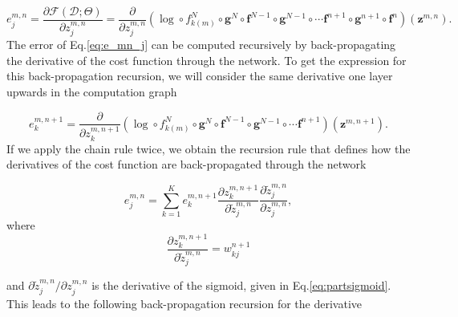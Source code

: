 \begin{equation}
e^{m,n}_j =  \frac{\partial \mathcal{F}(\mathcal{D};\Theta)}{\partial z^{m,n}_{j}} = \frac{\partial}{\partial z^{m,n}_{j}} (\log \circ f_{k(m)}^N \circ \mathbf{g}^N \circ \mathbf{f}^{N-1} \circ \mathbf{g}^{N-1} \circ \cdots \mathbf{f}^{n+1} \circ \mathbf{g}^{n+1} \circ \mathbf{f}^{n})(\mathbf{z}^{m,n}).
\label{eq:e_mn_j}
\end{equation}
%
The error of Eq.\ref{eq:e_mn_j} can be computed recursively by back-propagating the derivative of the cost function through the network.
To get the expression for this back-propagation recursion, we will consider the same derivative one layer upwards in the
computation graph  

\begin{equation}
e^{m,n+1}_k = \frac{\partial}{\partial z^{m,n+1}_{k}} (\log \circ f_{k(m)}^N \circ \mathbf{g}^N \circ \mathbf{f}^{N-1} \circ \mathbf{g}^{N-1} \circ \cdots \mathbf{f}^{n+1})(\mathbf{z}^{m,n+1}).
\end{equation}
%
%
\noindent If we apply the chain rule twice, we obtain the
recursion rule that defines how the derivatives of the cost function are back-propagated through the network\footnotemark{}

\begin{equation}
e^{m,n}_j = \sum_{k=1}^K e^{m,n+1}_k \frac{\partial z^{m,n+1}_k}{\partial \tilde{z}_{j}^{m,n}}\frac{\partial \tilde{z}^{m,n}_{j}}{\partial z_{j}^{m,n}},
\label{eq:chainRulRecursion}
\end{equation}
%
where %
\begin{equation}
\frac{\partial z^{m,n+1}_k}{\partial \tilde{z}_{j}^{m,n}} = w_{kj}^{n+1} 
\end{equation}

\noindent and ${\partial \tilde{z}^{m,n}_{j}}/{\partial z_{j}^{m,n}}$ is the derivative of the sigmoid, given in Eq.\ref{eq:partsigmoid}. This leads to the following back-propagation recursion for the derivative

